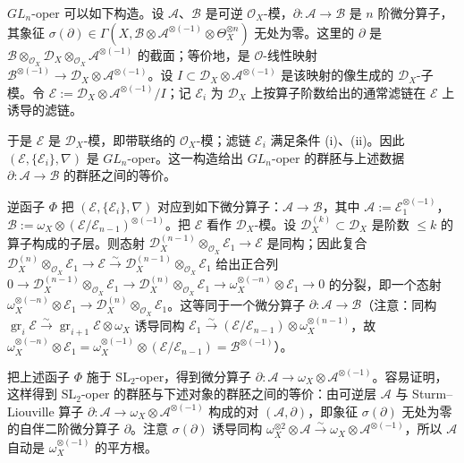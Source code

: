 $GL_n$-oper 可以如下构造。设 $\mathcal{A}$、$\mathcal{B}$ 是可逆 $\mathcal{O}_X$-模，$\partial: \mathcal{A} \to \mathcal{B}$ 是 $n$ 阶微分算子，其象征 $\sigma(\partial) \in \Gamma(X,\mathcal{B}\otimes\mathcal{A}^{\otimes(-1)}\otimes\Theta_X^{\otimes n})$ 无处为零。这里的 $\partial$ 是 $\mathcal{B}\otimes_{\mathcal{O}_X}\mathcal{D}_X\otimes_{\mathcal{O}_X}\mathcal{A}^{\otimes(-1)}$ 的截面；等价地，是 $\mathcal{O}$-线性映射 $\mathcal{B}^{\otimes(-1)} \to \mathcal{D}_X\otimes\mathcal{A}^{\otimes(-1)}$。设 $I \subset \mathcal{D}_X\otimes\mathcal{A}^{\otimes(-1)}$ 是该映射的像生成的 $\mathcal{D}_X$-子模。令 $\mathcal{E} := \mathcal{D}_X\otimes\mathcal{A}^{\otimes(-1)}/I$；记 $\mathcal{E}_i$ 为 $\mathcal{D}_X$ 上按算子阶数给出的通常滤链在 $\mathcal{E}$ 上诱导的滤链。

于是 $\mathcal{E}$ 是 $\mathcal{D}_X$-模，即带联络的 $\mathcal{O}_X$-模；滤链 $\mathcal{E}_i$ 满足条件 (i)、(ii)。因此 $(\mathcal{E},\{\mathcal{E}_i\},\nabla)$ 是 $GL_n$-oper。这一构造给出 $GL_n$-oper 的群胚与上述数据 $\partial: \mathcal{A} \to \mathcal{B}$ 的群胚之间的等价。

逆函子 $\Phi$ 把 $(\mathcal{E},\{\mathcal{E}_i\},\nabla)$ 对应到如下微分算子：$\mathcal{A} \to \mathcal{B}$，其中 $\mathcal{A} := \mathcal{E}_1^{\otimes(-1)}$，$\mathcal{B} := \omega_X\otimes(\mathcal{E}/\mathcal{E}_{n-1})^{\otimes(-1)}$。把 $\mathcal{E}$ 看作 $\mathcal{D}_X$-模。设 $\mathcal{D}_X^{(k)} \subset \mathcal{D}_X$ 是阶数 $\le k$ 的算子构成的子层。则态射 $\mathcal{D}_X^{(n-1)}\otimes_{\mathcal{O}_X}\mathcal{E}_1 \to \mathcal{E}$ 是同构；因此复合 $\mathcal{D}_X^{(n)}\otimes_{\mathcal{O}_X}\mathcal{E}_1 \to \mathcal{E} \xrightarrow{\sim} \mathcal{D}_X^{(n-1)}\otimes_{\mathcal{O}_X}\mathcal{E}_1$ 给出正合列 $0 \to \mathcal{D}_X^{(n-1)}\otimes_{\mathcal{O}_X}\mathcal{E}_1 \to \mathcal{D}_X^{(n)}\otimes_{\mathcal{O}_X}\mathcal{E}_1 \to \omega_X^{\otimes(-n)}\otimes\mathcal{E}_1 \to 0$ 的分裂，即一个态射 $\omega_X^{\otimes(-n)}\otimes\mathcal{E}_1 \to \mathcal{D}_X^{(n)}\otimes_{\mathcal{O}_X}\mathcal{E}_1$。这等同于一个微分算子 $\partial: \mathcal{A} \to \mathcal{B}$（注意：同构 $\operatorname{gr}_i\mathcal{E} \xrightarrow{\sim} \operatorname{gr}_{i+1}\mathcal{E}\otimes\omega_X$ 诱导同构 $\mathcal{E}_1 \xrightarrow{\sim} (\mathcal{E}/\mathcal{E}_{n-1})\otimes\omega_X^{\otimes(n-1)}$，故 $\omega_X^{\otimes(-n)}\otimes\mathcal{E}_1 = \omega_X^{\otimes(-1)}\otimes(\mathcal{E}/\mathcal{E}_{n-1}) = \mathcal{B}^{\otimes(-1)}$）。

把上述函子 $\Phi$ 施于 $\mathrm{SL}_2$-oper，得到微分算子 $\partial: \mathcal{A} \to \omega_X\otimes\mathcal{A}^{\otimes(-1)}$。容易证明，这样得到 $\mathrm{SL}_2$-oper 的群胚与下述对象的群胚之间的等价：由可逆层 $\mathcal{A}$ 与 Sturm--Liouville 算子 $\partial: \mathcal{A} \to \omega_X\otimes\mathcal{A}^{\otimes(-1)}$ 构成的对 $(\mathcal{A},\partial)$，即象征 $\sigma(\partial)$ 无处为零的自伴二阶微分算子 $\partial$。注意 $\sigma(\partial)$ 诱导同构 $\omega_X^{\otimes 2}\otimes\mathcal{A} \xrightarrow{\sim} \omega_X\otimes\mathcal{A}^{\otimes(-1)}$，所以 $\mathcal{A}$ 自动是 $\omega_X^{\otimes(-1)}$ 的平方根。

